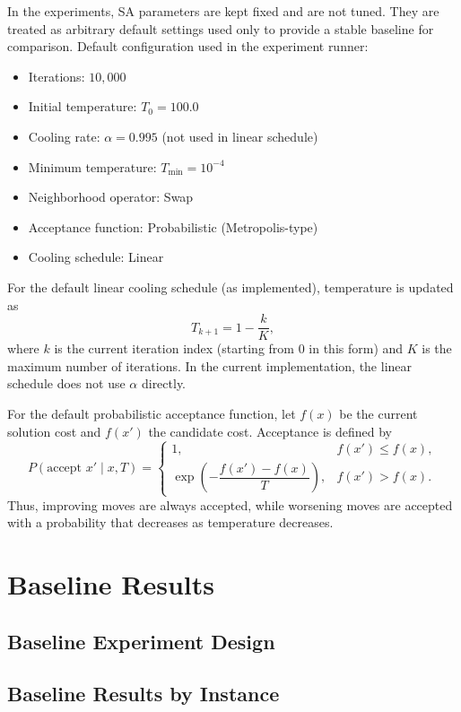 \documentclass[12pt,a4paper]{report}
\begin{document}
In the experiments, SA parameters are kept fixed and are not tuned. They are treated as arbitrary default settings used only to provide a stable baseline for comparison.
Default configuration used in the experiment runner:
\begin{itemize}
    \item Iterations: $10{,}000$
    \item Initial temperature: $T_0 = 100.0$
    \item Cooling rate: $\alpha = 0.995$ (not used in linear schedule)
    \item Minimum temperature: $T_{\min} = 10^{-4}$
    \item Neighborhood operator: Swap
    \item Acceptance function: Probabilistic (Metropolis-type)
    \item Cooling schedule: Linear
\end{itemize}

For the default linear cooling schedule (as implemented), temperature is updated as
\[
T_{k+1} = 1 - \frac{k}{K},
\]
where $k$ is the current iteration index (starting from $0$ in this form) and $K$ is the maximum number of iterations. In the current implementation, the linear schedule does not use $\alpha$ directly.

For the default probabilistic acceptance function, let $f(x)$ be the current solution cost and $f(x')$ the candidate cost. Acceptance is defined by
\[
P(\text{accept } x'\mid x, T)=
\begin{cases}
1, & f(x') \le f(x),\\
\exp\!\left(-\dfrac{f(x')-f(x)}{T}\right), & f(x') > f(x).
\end{cases}
\]
Thus, improving moves are always accepted, while worsening moves are accepted with a probability that decreases as temperature decreases.


\chapter{Baseline Results}
\section{Baseline Experiment Design}

\section{Baseline Results by Instance}
\end{document}
